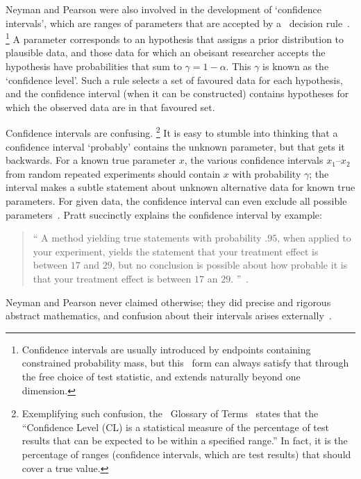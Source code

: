 Neyman and Pearson were also involved in the development of
`confidence intervals', which are ranges of parameters that are
accepted by a \pvalue\ decision rule~\cite{
clopper1934confidence,
neyman1935Intervals,
Neyman1937Outline
}.%
\footnote{%
Confidence intervals are usually introduced by endpoints containing constrained
probability mass, but this \pvalue\ form can always satisfy that through the
free choice of test statistic, and extends naturally beyond one dimension.%
}
A parameter corresponds to an hypothesis that assigns a prior distribution to
plausible data, and those data for which an obeisant researcher accepts the
hypothesis have probabilities that sum to $\gamma = 1 - \alpha$.
This $\gamma$ is known as the `confidence level'.
Such a rule selects a set of favoured data for each hypothesis, and the
confidence interval (when it can be constructed) contains hypotheses for which
the observed data are in that favoured set.

Confidence intervals are confusing.%
\footnote{%
Exemplifying such confusion,
the \atlas\ Glossary of Terms~\cite{atlas2022glossary} states that the
``Confidence Level (CL) is a statistical measure of the percentage of test
results that can be expected to be within a specified range.''
In fact, it is the percentage of ranges
(confidence intervals, which are test results)
that should cover a true value.%
}
It is easy to stumble into thinking that a confidence interval
`probably' contains the unknown parameter, but that gets it backwards.
For a known true parameter $x$, the various confidence intervals
$x_1\textrm{--}x_2$ from random repeated experiments should contain
$x$ with probability $\gamma$;
the interval makes a subtle statement about unknown alternative data for
known true parameters.
For given data, the confidence interval can even exclude all possible
parameters~\cite{
pratt1961testing,
Jaynes1976intervals
}.
Pratt succinctly explains the confidence interval by example:
\begin{quote}
\small
``%
A method yielding true statements with probability $.95$, when applied to your
experiment, yields the statement that your treatment effect is between $17$ and
$29$, but no conclusion is possible about how probable it is that your
treatment effect is between $17$ an $29$.%
''~\cite{pratt1961testing}.
\end{quote}
Neyman and Pearson never claimed otherwise; they did precise and rigorous
abstract mathematics, and confusion about their intervals arises
externally~\cite{jaynes2003probability}.

